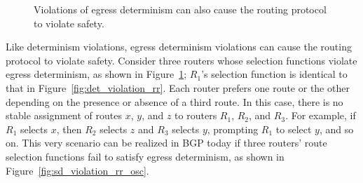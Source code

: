 \begin{figure}
\centering
\begin{psfrags}
%
%
\hspace{-0.7in}

\end{psfrags}
\caption[Egress determinism violations can cause safety
  violations.]{Violations of egress determinism can also cause the
  routing protocol to violate safety.}
\label{fig:abstract_sd}
\end{figure}


Like determinism violations, egress determinism violations can cause the
routing protocol to violate safety.  Consider three routers whose
selection functions violate egress determinism, as shown in
Figure~\ref{fig:abstract_sd}; $R_1$'s selection function is identical to
that in Figure~\ref{fig:det_violation_rr}. Each router prefers one route
or the other depending on the presence or absence of a third route.  In
this case, there is no stable assignment of routes $x$, $y$, and $z$ to
routers $R_1$, $R_2$, and $R_3$.  For example, if $R_1$ selects $x$,
then $R_2$ selects $z$ and $R_3$ selects $y$, prompting $R_1$ to select
$y$, and so on.  This very scenario can be realized in BGP today if
three routers' route selection functions fail to satisfy egress
determinism, as shown in Figure~\ref{fig:sd_violation_rr_osc}.


